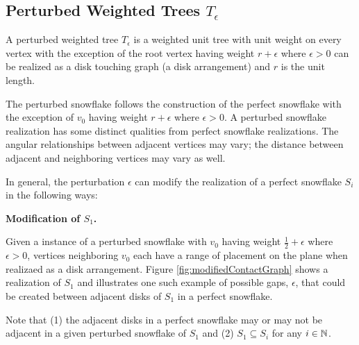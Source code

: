 
\subsection{Perturbed Weighted Trees $T_\epsilon$}

A perturbed weighted tree $T_\epsilon$ is a weighted unit tree with unit weight on every vertex with the exception of the root vertex having weight $r+\epsilon$ where $\epsilon>0$ can be realized as a disk touching graph (a disk arrangement) and $r$ is the unit length.  

The perturbed snowflake follows the construction of the perfect snowflake with the exception of $v_0$ having weight $r+ \epsilon$ where $\epsilon > 0$.
A perturbed snowflake realization has some distinct qualities from perfect snowflake realizations.  
The angular relationships between adjacent vertices may vary; the distance between adjacent and neighboring vertices may vary as well.


In general, the perturbation $\epsilon$ can modify the realization of a perfect snowflake $S_i$ in the following ways:

\textbf{Modification of $S_1$.} 

Given a instance of a perturbed snowflake with $v_0$ having weight $\frac{1}{2} + \epsilon$ where $\epsilon > 0$, vertices neighboring $v_0$ each have a range of placement on the plane when realizaed as a disk arrangement. 
Figure \ref{fig:modifiedContactGraph} shows a realization of $S_1$ and illustrates one such example of possible gaps, $\epsilon$, that could be created between adjacent disks of $S_1$ in a perfect snowflake.  

Note that (1) the adjacent disks in a perfect snowflake may or may not be adjacent in a given perturbed snowflake of $S_1$ and (2) $S_1 \subseteq S_i$ for any $i \in {\mathbb{N}}$.  